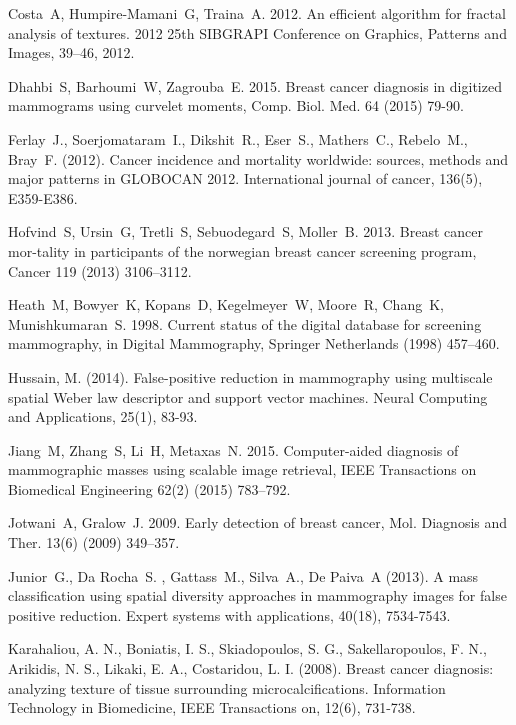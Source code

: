 \documentclass[review,12pt]{elsarticle}
\begin{document}
\begin{thebibliography}{1}

Costa~A, Humpire-Mamani~G, Traina~A. 2012. An efficient algorithm for fractal analysis of textures. 2012 25th SIBGRAPI Conference on Graphics, Patterns and Images, 39–46, 2012.

Dhahbi~S, Barhoumi~W, Zagrouba~E. 2015. Breast cancer diagnosis in digitized mammograms using curvelet moments, Comp. Biol. Med. 64 (2015) 79-90.

Ferlay~J., Soerjomataram~I., Dikshit~R., Eser~S., Mathers~C., Rebelo~M., Bray~F. (2012). Cancer incidence and mortality worldwide: sources, methods and major patterns in GLOBOCAN 2012. International journal of cancer, 136(5), E359-E386.

Hofvind~S, Ursin~G, Tretli~S, Sebuodegard~S, Moller~B. 2013. Breast cancer mor-tality in participants of the norwegian breast cancer screening program, Cancer 119 (2013) 3106–3112.

Heath~M, Bowyer~K, Kopans~D, Kegelmeyer~W, Moore~R, Chang~K, Munishkumaran~S. 1998. Current status of the digital database for screening mammography, in Digital Mammography, Springer Netherlands (1998) 457–460.

Hussain, M. (2014). False-positive reduction in mammography using multiscale spatial Weber law descriptor and support vector machines. Neural Computing and Applications, 25(1), 83-93.

Jiang~M, Zhang~S, Li~H, Metaxas~N. 2015. Computer-aided diagnosis of mammographic masses using scalable image retrieval, IEEE Transactions on Biomedical Engineering 62(2) (2015) 783–792.

Jotwani~A, Gralow~J. 2009. Early detection of breast cancer, Mol. Diagnosis and Ther. 13(6) (2009) 349–357.

Junior~G., Da Rocha~S. , Gattass~M., Silva~A., De Paiva~A (2013). A mass classification using spatial diversity approaches in mammography images for false positive reduction. Expert systems with applications, 40(18), 7534-7543.

Karahaliou, A. N., Boniatis, I. S., Skiadopoulos, S. G., Sakellaropoulos, F. N., Arikidis, N. S., Likaki, E. A.,  Costaridou, L. I. (2008). Breast cancer diagnosis: analyzing texture of tissue surrounding microcalcifications. Information Technology in Biomedicine, IEEE Transactions on, 12(6), 731-738.


\end{thebibliography}
\end{document}
